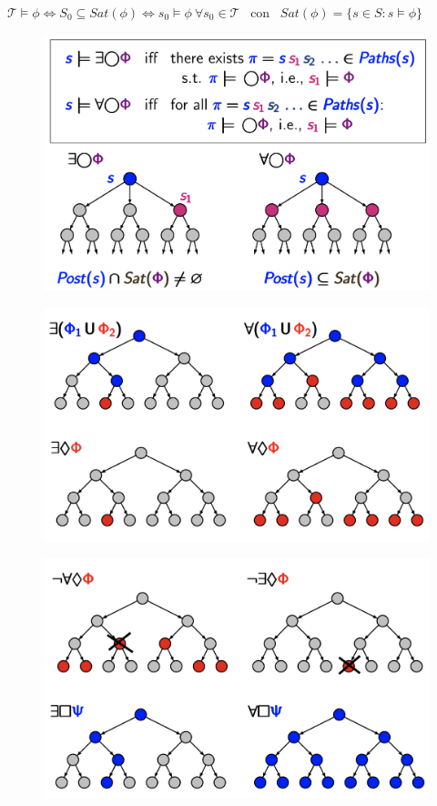 \documentclass[a4paper, notitlepage, 9pt]{extreport}
\begin{document}
\noindent
$\mathcal{T} \vDash \phi \Leftrightarrow S_0 \subseteq Sat(\phi) \Leftrightarrow s_0 \vDash \phi ~\forall s_0 \in \mathcal{T}$ ~con~ $Sat(\phi) = \{s \in S: s \vDash \phi \}$
\begin{multicols}{3}
	\begin{figure}[H]
		\centering
		\includegraphics[scale=0.126]{NEXT}
	\end{figure}
\columnbreak
	\begin{figure}[H]
		\centering
		\includegraphics[scale=0.126]{CT1}
	\end{figure}
\columnbreak
	\begin{figure}[H]
		\centering
		\includegraphics[scale=0.126]{CT2}
	\end{figure}
\end{multicols}
\end{document}
